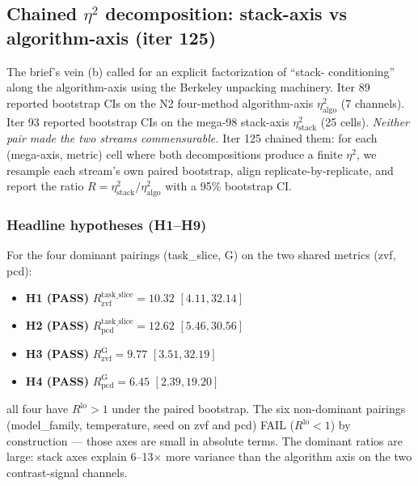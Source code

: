 \subsection{Chained \texorpdfstring{$\eta^2$}{eta\textasciicircum 2} decomposition: stack-axis vs algorithm-axis (iter 125)}
\label{sec:p5-iter125-chained-eta2}

The brief's vein (b) called for an explicit factorization of ``stack-
conditioning'' along the algorithm-axis using the Berkeley unpacking
machinery. Iter 89 reported bootstrap CIs on the N2 four-method
algorithm-axis $\eta^2_{\mathrm{algo}}$ (7 channels). Iter 93 reported
bootstrap CIs on the mega-98 stack-axis $\eta^2_{\mathrm{stack}}$ (25
cells). \emph{Neither pair made the two streams commensurable.} Iter 125
chained them: for each (mega-axis, metric) cell where both
decompositions produce a finite $\eta^2$, we resample each stream's
own paired bootstrap, align replicate-by-replicate, and report the
ratio $R = \eta^2_{\mathrm{stack}} / \eta^2_{\mathrm{algo}}$ with a 95\%
bootstrap CI.

\subsubsection{Headline hypotheses (H1--H9)}
\label{sec:p5-iter125-headlines}
For the four dominant pairings (task\_slice, G) on the two shared
metrics (zvf, pcd):
\begin{itemize}
\item \textbf{H1 (PASS)} $R_{\mathrm{zvf}}^{\mathrm{task\_slice}} = 10.32$ $[4.11, 32.14]$
\item \textbf{H2 (PASS)} $R_{\mathrm{pcd}}^{\mathrm{task\_slice}} = 12.62$ $[5.46, 30.56]$
\item \textbf{H3 (PASS)} $R_{\mathrm{zvf}}^{\mathrm{G}} = 9.77$ $[3.51, 32.19]$
\item \textbf{H4 (PASS)} $R_{\mathrm{pcd}}^{\mathrm{G}} = 6.45$ $[2.39, 19.20]$
\end{itemize}
all four have $R^{\mathrm{lo}} > 1$ under the paired bootstrap. The
six non-dominant pairings (model\_family, temperature, seed on zvf
and pcd) FAIL ($R^{\mathrm{lo}} < 1$) by construction --- those axes
are small in absolute terms. The dominant ratios are large: stack
axes explain 6--13$\times$ more variance than the algorithm axis on
the two contrast-signal channels.

